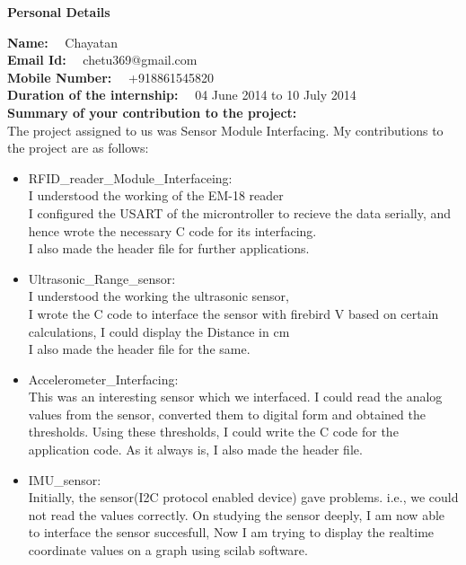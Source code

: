 \documentclass[a4paper,12 pt]{article}
\begin{document}
\begin{center}
\textbf{\large Personal Details}
\end{center}
\hspace{-1mm}
\vspace{5mm}\textbf{Name: } \ \ Chayatan\\ 
\vspace{5mm}\textbf{Email Id: } \ \ chetu369@gmail.com\\
\vspace{5mm}\textbf{Mobile Number: } \ \ +918861545820\\
\vspace{5mm}\textbf{Duration of the internship: } \ \ 04 June 2014 to 10 July 2014\\
\vspace{5mm}\textbf{Summary of your contribution to the project: }\\
The project assigned to us was Sensor Module Interfacing. My contributions to the project are as follows:
\begin{itemize}
\item RFID\_reader\_Module\_Interfaceing:\\

I understood the working of the EM-18 reader\\
I configured the USART of the microntroller to recieve the data serially, and hence wrote the necessary C code for its interfacing.\\
I also made the header file for further applications.\\

\item Ultrasonic\_Range\_sensor:\\

I understood the working the ultrasonic sensor,\\
I wrote the C code to interface the sensor with firebird V based on certain calculations, I could display the Distance in cm\\
I also made the header file for the same.\\

\item Accelerometer\_Interfacing:\\

This was an interesting sensor which we interfaced. I could read the analog values from the sensor, converted them to digital form and obtained the thresholds. Using these thresholds, I could write the C code for the application code.
As it always is, I also made the header file.\\

\item IMU\_sensor:\\
Initially, the sensor(I2C protocol enabled device) gave problems.  i.e., we could not read the values correctly. On studying the sensor deeply, I am now able to interface the sensor succesfull, Now I am trying to display the realtime coordinate values on a graph using scilab software.\\


\end{itemize}
\vspace{5mm}
\end{document}

